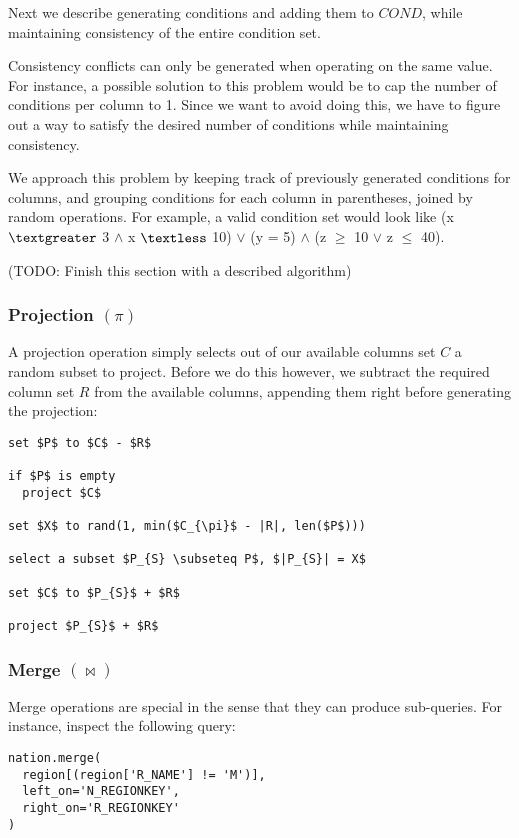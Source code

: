\documentclass[10pt, twocolumn]{article}
\begin{document}
\spacing
\noindent
Next we describe generating conditions and adding them to $COND$, while maintaining consistency of the entire condition set.

\spacing
\noindent
Consistency conflicts can only be generated when operating on the same value. For instance, a possible solution to this problem would be to cap the number of conditions per column to 1. Since we want to avoid doing this, we have to figure out a way to satisfy the desired number of conditions while maintaining consistency.

\spacing
\noindent
We approach this problem by keeping track of previously generated conditions for columns, and grouping conditions for each column in parentheses, joined by random operations. For example, a valid condition set would look like (x $\textgreater$ 3 $\land$ x $\textless$ 10) $\lor$ (y = 5) $\land$ (z $\geq$ 10 $\lor$ z $\leq$ 40).

\spacing
\noindent
(TODO: Finish this section with a described algorithm)

\subsubsection*{Projection $(\pi)$}

A projection operation simply selects out of our available columns set $C$ a random subset to project. Before we do this however, we subtract the required column set $R$ from the available columns, appending them right before generating the projection:

\spacing
\begin{lstlisting}
set $P$ to $C$ - $R$

if $P$ is empty
  project $C$

set $X$ to rand(1, min($C_{\pi}$ - |R|, len($P$)))

select a subset $P_{S} \subseteq P$, $|P_{S}| = X$

set $C$ to $P_{S}$ + $R$

project $P_{S}$ + $R$
\end{lstlisting}

\subsubsection*{Merge $(\bowtie)$}

Merge operations are special in the sense that they can produce sub-queries. For instance, inspect the following query:

\begin{verbatim}
nation.merge(
  region[(region['R_NAME'] != 'M')],
  left_on='N_REGIONKEY',
  right_on='R_REGIONKEY'
)
\end{verbatim}
\end{document}
